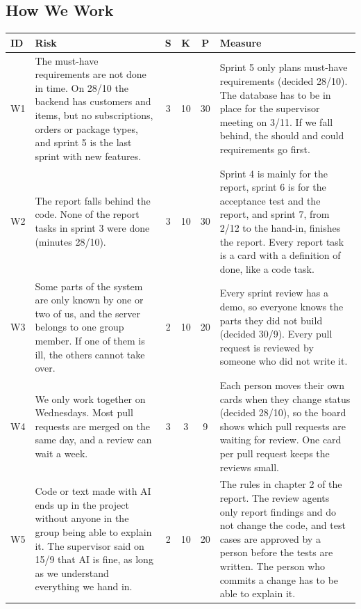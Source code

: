 \documentclass[a4paper,11pt]{article}
\begin{document}
\subsection{How We Work}

\begin{center}
\begin{tabular}{@{}l >{\raggedright\arraybackslash}p{5.2cm} c c c >{\raggedright\arraybackslash}p{6.2cm}@{}}
\textbf{ID} & \textbf{Risk} & \textbf{S} & \textbf{K} & \textbf{P} & \textbf{Measure} \\
\hline
W1 & The must-have requirements are not done in time. On 28/10 the backend has customers and items, but no subscriptions, orders or package types, and sprint 5 is the last sprint with new features. & 3 & 10 & 30 & Sprint 5 only plans must-have requirements (decided 28/10). The database has to be in place for the supervisor meeting on 3/11. If we fall behind, the should and could requirements go first. \\
\hline
W2 & The report falls behind the code. None of the report tasks in sprint 3 were done (minutes 28/10). & 3 & 10 & 30 & Sprint 4 is mainly for the report, sprint 6 is for the acceptance test and the report, and sprint 7, from 2/12 to the hand-in, finishes the report. Every report task is a card with a definition of done, like a code task. \\
\hline
W3 & Some parts of the system are only known by one or two of us, and the server belongs to one group member. If one of them is ill, the others cannot take over. & 2 & 10 & 20 & Every sprint review has a demo, so everyone knows the parts they did not build (decided 30/9). Every pull request is reviewed by someone who did not write it. \\
\hline
W4 & We only work together on Wednesdays. Most pull requests are merged on the same day, and a review can wait a week. & 3 & 3 & 9 & Each person moves their own cards when they change status (decided 28/10), so the board shows which pull requests are waiting for review. One card per pull request keeps the reviews small. \\
\hline
W5 & Code or text made with AI ends up in the project without anyone in the group being able to explain it. The supervisor said on 15/9 that AI is fine, as long as we understand everything we hand in. & 2 & 10 & 20 & The rules in chapter 2 of the report. The review agents only report findings and do not change the code, and test cases are approved by a person before the tests are written. The person who commits a change has to be able to explain it. \\
\hline
\end{tabular}
\end{center}
\end{document}
